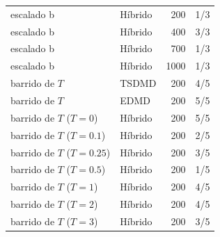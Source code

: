 {\begin{tabular}{llrr}
escalado b & Híbrido & 200 & 1/3 \\
escalado b & Híbrido & 400 & 3/3 \\
escalado b & Híbrido & 700 & 1/3 \\
escalado b & Híbrido & 1000 & 1/3 \\
barrido de $T$ & TSDMD & 200 & 4/5 \\
barrido de $T$ & EDMD & 200 & 5/5 \\
barrido de $T$ ($T = 0$) & Híbrido & 200 & 5/5 \\
barrido de $T$ ($T = 0.1$) & Híbrido & 200 & 2/5 \\
barrido de $T$ ($T = 0.25$) & Híbrido & 200 & 3/5 \\
barrido de $T$ ($T = 0.5$) & Híbrido & 200 & 1/5 \\
barrido de $T$ ($T = 1$) & Híbrido & 200 & 4/5 \\
barrido de $T$ ($T = 2$) & Híbrido & 200 & 4/5 \\
barrido de $T$ ($T = 3$) & Híbrido & 200 & 3/5 \\
\bottomrule
\end{tabular}}
